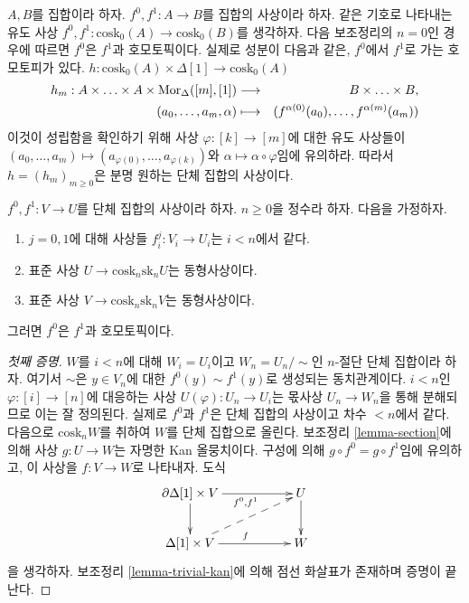 \noindent
$A, B$를 집합이라 하자. $f^0, f^1 : A \to B$를 집합의 사상이라 하자.
같은 기호로 나타내는 유도 사상
$f^0, f^1 : \text{cosk}_0(A) \to \text{cosk}_0(B)$를 생각하자. 다음
보조정리의 $n = 0$인 경우에 따르면 $f^0$은 $f^1$과 호모토픽이다.
실제로 성분이 다음과 같은, $f^0$에서 $f^1$로 가는 호모토피가 있다.
$h : \text{cosk}_0(A) \times \Delta[1] \to \text{cosk}_0(A)$
\begin{eqnarray*}
h_m : A \times \ldots \times A \times \mathop{\mathrm{Mor}}\nolimits_{\Delta}([m], [1])
& \longrightarrow &
B \times \ldots \times B, \\
(a_0, \ldots, a_m, \alpha) & \longmapsto &
(f^{\alpha(0)}(a_0), \ldots, f^{\alpha(m)}(a_m))
\end{eqnarray*}
이것이 성립함을 확인하기 위해 사상 $\varphi : [k] \to [m]$에 대한
유도 사상들이
$(a_0, \ldots, a_m) \mapsto (a_{\varphi(0)}, \ldots, a_{\varphi(k)})$와
$\alpha \mapsto \alpha \circ \varphi$임에 유의하라. 따라서
$h = (h_m)_{m \geq 0}$은 분명 원하는 단체 집합의 사상이다.

\begin{lemma}
\label{lemma-homotopy}
$f^0, f^1 : V \to U$를 단체 집합의 사상이라 하자. $n \geq 0$을
정수라 하자. 다음을 가정하자.
\begin{enumerate}
\item $j = 0, 1$에 대해 사상들 $f^j_i : V_i \to U_i$는
$i < n$에서 같다.
\item 표준 사상 $U \to \text{cosk}_n \text{sk}_n U$는 동형사상이다.
\item 표준 사상 $V \to \text{cosk}_n \text{sk}_n V$는 동형사상이다.
\end{enumerate}
그러면 $f^0$은 $f^1$과 호모토픽이다.
\end{lemma}

\begin{proof}[첫째 증명]
$W$를 $i < n$에 대해 $W_i = U_i$이고
$W_n = U_n / \sim$인 $n$-절단 단체 집합이라 하자. 여기서 $\sim$은
$y \in V_n$에 대한 $f^0(y) \sim f^1(y)$로 생성되는 동치관계이다.
$i < n$인 $\varphi : [i] \to [n]$에 대응하는 사상
$U(\varphi) : U_n \to U_i$는 몫사상 $U_n \to W_n$을 통해 분해되므로
이는 잘 정의된다. 실제로 $f^0$과 $f^1$은 단체 집합의 사상이고 차수
$< n$에서 같다. 다음으로 $\text{cosk}_n W$를 취하여 $W$를 단체
집합으로 올린다. 보조정리 \ref{lemma-section}에 의해 사상
$g : U \to W$는 자명한 Kan 올뭉치이다. 구성에 의해
$g \circ f^0 = g \circ f^1$임에 유의하고, 이 사상을
$f : V \to W$로 나타내자. 도식
$$
\xymatrix{
\partial \Delta[1] \times V \ar[rr]_{f^0, f^1} \ar[d] & & U \ar[d] \\
\Delta[1] \times V \ar[rr]^f \ar@{-->}[rru] & & W
}
$$
을 생각하자. 보조정리 \ref{lemma-trivial-kan}에 의해 점선 화살표가
존재하며 증명이 끝난다.
\end{proof}

